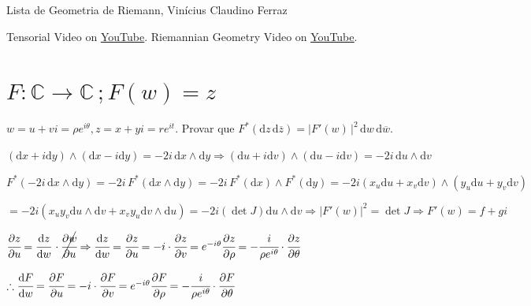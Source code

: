 \documentclass[10pt,a4paper]{article}
\begin{document}
	\Large

	\begin{center}
		Lista de Geometria de Riemann, Vin\'icius Claudino Ferraz
	\end{center}

	\normalsize

Tensorial Video on \href{https://www.youtube.com/watch?v=mmzqmIcX7xo}{\color{blue}\underline{YouTube}}. Riemannian Geometry Video on \href{https://www.youtube.com/watch?v=Z3IXeWvEEa4}{\color{blue}\underline{YouTube}}.

	\section{$F: \mathbb{C} \rightarrow \mathbb{C} \,; F(w) = z$}
		\begin{flushright}
		\end{flushright}

		$w = u + vi = \rho e^{i\theta}, z = x + yi = r e^{it}$. Provar que $F^* (\mathrm{d}z \, \mathrm{d}\overline{z}) = \vert F'(w) \, \vert^2\, \mathrm{d}w \, \mathrm{d}\overline{w}$.

		$(\mathrm{d}x + i \mathrm{d}y) \wedge (\mathrm{d}x - i \mathrm{d}y) = - 2i \, \mathrm{d}x \wedge \mathrm{d}y \Rightarrow (\mathrm{d}u + i \mathrm{d}v) \wedge (\mathrm{d}u - i \mathrm{d}v) = - 2i \, \mathrm{d}u \wedge \mathrm{d}v$

		$F^* (- 2i \,\mathrm{d}x \wedge \mathrm{d}y) = -2i \, F^* (\mathrm{d}x \wedge \mathrm{d}y) = -2i\, F^* (\mathrm{d}x) \wedge F^*(\mathrm{d}y) = -2i (x_u \mathrm{d}u + x_v \mathrm{d}v) \wedge (y_u \mathrm{d}u + y_v \mathrm{d}v)$

		$= -2i (x_u y_v \mathrm{d}u \wedge \mathrm{d}v + x_v y_u \mathrm{d}v \wedge \mathrm{d}u) = -2i (\det J) \mathrm{d}u \wedge \mathrm{d}v \Rightarrow \vert F'(w) \vert^2 = \det J \Rightarrow F'(w) = f + gi$

		$\cfrac{\partial z}{\partial u} = \cfrac{\mathrm{d}z}{\mathrm{d}w} \, \cdot \cancel{\cfrac{\partial w}{\partial u}} \Rightarrow \cfrac{\mathrm{d}z}{\mathrm{d}w} = \cfrac{\partial z}{\partial u} = -i \cdot \cfrac{\partial z}{\partial v} = e^{-i\theta} \cfrac{\partial z}{\partial \rho} = -\cfrac{i}{\rho e^{i\theta}} \cdot \cfrac{\partial z}{\partial \theta}$

		$\therefore \cfrac{\mathrm{d}F}{\mathrm{d}w} = \cfrac{\partial F}{\partial u} = -i \cdot \cfrac{\partial F}{\partial v} = e^{-i\theta} \cfrac{\partial F}{\partial \rho} = -\cfrac{i}{\rho e^{i\theta}} \cdot \cfrac{\partial F}{\partial \theta}$
\end{document}
